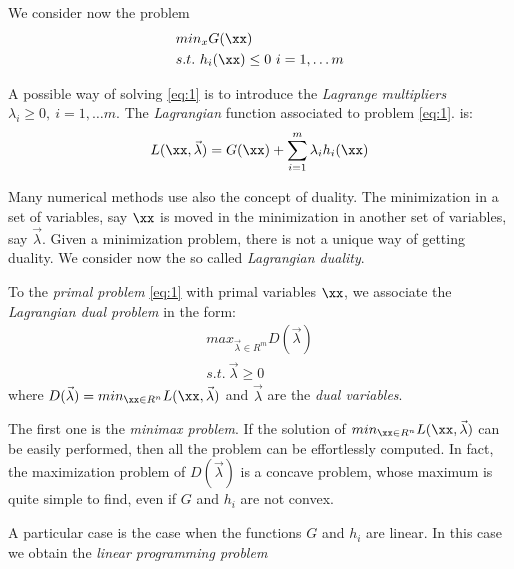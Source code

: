 We consider now the problem
\begin{eqnarray}
& min_x G(\xx) \\
& s.t. \ h_i(\xx) \leq 0 \ i=1, \ldots m
\label{eq:1}
\end{eqnarray}

A possible way of solving \eqref{eq:1} is to introduce the \textit{Lagrange multipliers} $\lambda_i \geq 0, \ i=1, \ldots m.$ The \textit{Lagrangian} function associated to problem \eqref{eq:1}. is:
$$L(\xx, \vec{\lambda})=G(\xx)+\sum_{i=1}^m \lambda_i h_i(\xx)$$

Many numerical methods use also the concept of duality. The minimization in a set of variables, say $\xx$ is moved in the minimization in another set of variables, say $\vec{\lambda}$. Given a minimization problem, there is not a unique way of getting duality. We consider now the so called \textit{Lagrangian duality}.

\begin{definition}
To the \textit{primal problem} \eqref{eq:1} with primal variables $\xx$, we associate the \textit{Lagrangian dual problem} in the form:
\begin{eqnarray*}
max_{\vec{\lambda}\in R^m} D(\vec{\lambda}) \\
s.t. \ \vec{\lambda} \geq 0
\end{eqnarray*}
where $D(\vec{\lambda})=min_{\xx \in R^n} L(\xx, \vec{\lambda})$ and $\vec{\lambda}$ are the \textit{dual variables}.
\end{definition}

The first one is the \textit{minimax problem}. If the solution of $min_{\xx \in R^n} L(\xx, \vec{\lambda})$ can be easily performed, then all the problem can be effortlessly computed. In fact, the maximization problem of $D(\vec{\lambda})$ is a concave problem, whose maximum is quite simple to find, even if $G$ and $h_i$ are not convex.

A particular case is the case when the functions $G$ and $h_i$ are linear. In this case we obtain the \textit{linear programming problem}


